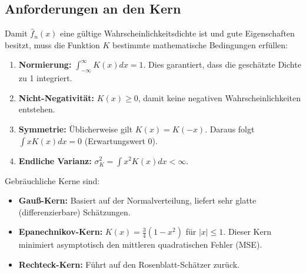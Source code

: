 \documentclass[a4paper,12pt]{article}
\begin{document}
\begin{center}
\end{center}

\subsection{Anforderungen an den Kern}
Damit $\hat{f}_n(x)$ eine gültige Wahrscheinlichkeitsdichte ist und gute Eigenschaften besitzt, muss die Funktion $K$ bestimmte mathematische Bedingungen erfüllen:
\begin{enumerate}
    \item \textbf{Normierung:} $\int_{-\infty}^{\infty} K(x) dx = 1$. Dies garantiert, dass die geschätzte Dichte zu 1 integriert.
    \item \textbf{Nicht-Negativität:} $K(x) \ge 0$, damit keine negativen Wahrscheinlichkeiten entstehen.
    \item \textbf{Symmetrie:} Üblicherweise gilt $K(x) = K(-x)$. Daraus folgt $\int x K(x) dx = 0$ (Erwartungswert 0).
    \item \textbf{Endliche Varianz:} $\sigma_K^2 = \int x^2 K(x) dx < \infty$.
\end{enumerate}

Gebräuchliche Kerne sind:
\begin{itemize}
    \item \textbf{Gauß-Kern:} Basiert auf der Normalverteilung, liefert sehr glatte (differenzierbare) Schätzungen.
    \item \textbf{Epanechnikov-Kern:} $K(x) = \frac{3}{4}(1-x^2)$ für $|x| \le 1$. Dieser Kern minimiert asymptotisch den mittleren quadratischen Fehler (MSE).
    \item \textbf{Rechteck-Kern:} Führt auf den Rosenblatt-Schätzer zurück.
\end{itemize}
\end{document}
